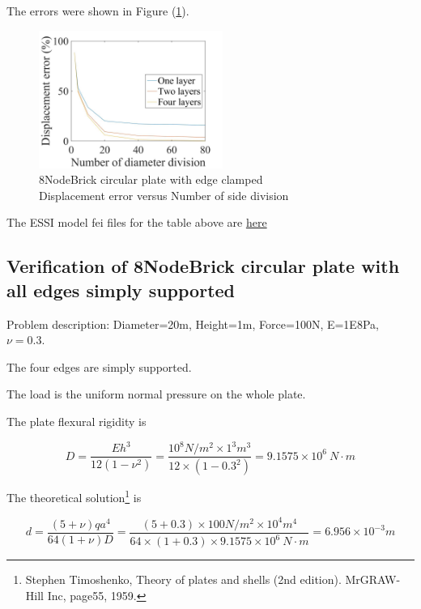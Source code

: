 \documentclass[fleqn,11pt,letter]{article}
\begin{document}
The errors were shown in Figure (\ref{fig 8NodeBrick circular plate with edge clamped}).
\begin{figure}[H]
    \centering
    \includegraphics[width=6cm]{../Figure_files/8NodeBrick/error8brick_circular_plate_clamped.jpeg}
  \captionsetup{justification=centering,margin=3cm}
  \caption{8NodeBrick circular plate with edge clamped\\
      Displacement error   versus   Number of side division}
  \label{fig 8NodeBrick circular plate with edge clamped}
\end{figure}



The ESSI model fei files for the table above are \href{https://github.com/yuan-energy/ESSI_Verification/blob/master/8NodeBrick/circular_plate_clamped/circular_plate_clamped.tar.gz?raw=true}{here}






\newpage
\subsection{Verification of 8NodeBrick circular plate with all edges simply supported}


Problem description: Diameter=20m, Height=1m, Force=100N, E=1E8Pa, $\nu=0.3$. 

The four edges are simply supported. 

The load is the uniform normal pressure on the whole plate. 


The plate flexural rigidity is 

\begin{equation}
  D=\frac{Eh^3}{12(1-\nu^2)}=\frac{10^8 N/m^2 \times 1^3 m^3 }{12 \times (1-0.3^2) }= 9.1575 \times 10^6 \ N\cdot m
\end{equation}

The theoretical solution\footnote{Stephen Timoshenko, Theory of plates and shells (2nd edition). MrGRAW-Hill Inc, page55, 1959.} is 

\begin{equation}
  d= \frac{(5+\nu)  q a^4}{64(1+\nu) D}=\frac{(5+0.3)\times 100 N/m^2 \times 10^4 m^4}{64\times(1+0.3) \times 9.1575 \times 10^6 \ N\cdot m}=6.956\times 10^{-3} m
\end{equation}
\end{document}
